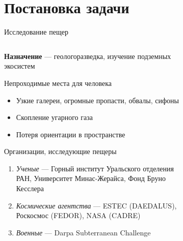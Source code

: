 \section{Постановка задачи}

\begin{frame}[t]{Исследование пещер}


    \begin{columns}[T,onlytextwidth]
        \begin{column}{0.62\textwidth}
            \small
                \textbf{Назначение} --- геологоразведка, изучение подземных экосистем
            \begin{exampleblock}{Непроходимые места для человека}
                \begin{itemize}
                    \item Узкие галереи, огромные пропасти, обвалы, сифоны
                    \item Скопление угарного газа
                    \item Потеря ориентации в пространстве
                \end{itemize}
            \end{exampleblock}
            \vspace{-0.2cm}
            \begin{alertblock}{Организации, исследующие пещеры}
                \begin{enumerate}
                    \item \textit{Ученые} --- Горный институт Уральского отделения РАН, Университет Минас-Жерайса, Фонд Бруно Кесслера
                    \item \textit{Космические агентства} --- ESTEC (DAEDALUS), Роскосмос (FEDOR), NASA (CADRE)
                    \item \textit{Военные} --- Darpa Subterranean Challenge
                \end{enumerate}
            \end{alertblock}
        \end{column}
        \begin{column}{0.37\textwidth}
            \vspace{0.025cm}
            \begin{figure}[H]
                \begin{subfigure}{0.49\textwidth}
                    \centering\includegraphics[height=1.75cm,width=1\textwidth,keepaspectratio]{../images/slides/rip.jpg}

\end{subfigure}
\end{figure}
\end{column}
\end{columns}
\end{frame}
